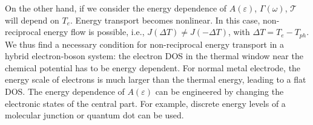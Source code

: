 \documentclass[aps
,twocolumn
,floatfix,footinbib,prl,longbibliography
]{revtex4-1}
\newcommand{\revision}[1]{{\color{blue}{#1}}}
\begin{document}
On the other hand, if we consider the energy dependence of $A(\varepsilon)$, $\Gamma(\omega)$, $\mathcal{T}^{}$ will depend on $T_e$. Energy transport becomes nonlinear. In this case, non-reciprocal energy flow is possible, i.e., $J(\Delta T)\neq J(-\Delta T)$, with $\Delta T=T_e-T_{ph}$. We thus find a necessary condition for non-reciprocal energy transport in a hybrid electron-boson system: the electron DOS in the thermal window near the chemical potential has to be energy dependent\cite{zhang2013thermal,ren2013heat}. For normal metal electrode, the energy scale of electrons is much larger than the thermal energy, leading to a flat DOS. The energy dependence of $A(\varepsilon)$ can be engineered by changing the electronic states of the central part. For example, discrete energy levels of a molecular junction or quantum dot can be used. %
\end{document}

